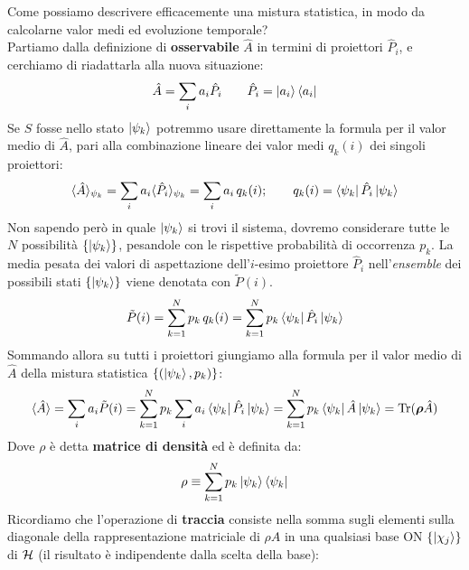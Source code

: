 \documentclass[../../InformazioneQuantistica.tex]{subfiles}
\begin{document}
Come possiamo descrivere efficacemente una mistura statistica, in modo da calcolarne valor medi ed evoluzione temporale?\\
Partiamo dalla definizione di \textbf{osservabile} $\hat{A}$ in termini di proiettori $\hat{P}_i$, e cerchiamo di riadattarla alla nuova situazione:
\begin{align}
\hat{A} = \sum_i a_i \hat{P}_i \qquad \hat{P}_i = \Ket{a_i}\Bra{a_i}
\label{eqn:osservabile-def}
\end{align}
Se $S$ fosse nello stato $\Ket{\psi_k}$ potremmo usare direttamente la formula per il valor medio di $\hat{A}$, pari alla combinazione lineare dei valor medi $q_k(i)$ dei singoli proiettori:
\begin{align}
\langle \hat{A} \rangle_{\psi_k} = \sum_i a_i \langle \hat{P}_i \rangle_{\psi_k} = \sum_i a_i\, q_k(i); \qquad q_k(i) = \Bra{\psi_k}\hat{P}_i\Ket{\psi_k}
\label{eqn:val-medio-psik}
\end{align}
Non sapendo però in quale $\Ket{\psi_k}$ si trovi il sistema, dovremo considerare tutte le $N$ possibilità $\{\Ket{\psi_k}\}$, pesandole con le rispettive probabilità di occorrenza $p_k$. La media pesata dei valori di aspettazione dell'$i$-esimo proiettore $\hat{P}_i$ nell'\textit{ensemble} dei possibili stati $\{\Ket{\psi_k}\}$ viene denotata con $\tilde{P}(i)$. 
\begin{align*}
\tilde{P}(i) = \sum_{k=1}^N p_k \,q_k(i) = \sum_{k=1}^N p_k \Bra{\psi_k}\hat{P}_i \Ket{\psi_k}
\end{align*}
Sommando allora su tutti i proiettori giungiamo alla formula per il valor medio di $\hat{A}$ della mistura statistica $\{(\Ket{\psi_k},p_k)\}$:
\begin{align}
\langle \hat{A} \rangle = \sum_i a_i \tilde{P}(i) = \sum_{k=1}^N p_k \sum_i a_i \Bra{\psi_k}\hat{P}_i\Ket{\psi_k} = \sum_{k=1}^N p_k \Bra{\psi_k}\hat{A}\Ket{\psi_k} = \operatorname{Tr}(\bm{\rho} \hat{A})
\label{eqn:traccia-valor-medio}
\end{align}
Dove $\rho$ è detta \textbf{matrice di densità} ed è definita da:
\begin{align}
\rho \equiv \sum_{k=1}^N p_k \Ket{\psi_k}\Bra{\psi_k}
\label{eqn:matrice-density}
\end{align}
Ricordiamo che l'operazione di \textbf{traccia} consiste nella somma sugli elementi sulla diagonale della rappresentazione matriciale di $\rho A$ in una qualsiasi base ON $\{\Ket{\chi_j}\}$ di $\mathcal{H}$ (il risultato è indipendente dalla scelta della base):
\end{document}

